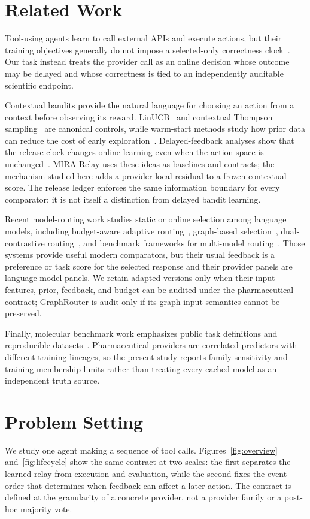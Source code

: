 \documentclass[sigconf,anonymous]{aamas}
\begin{document}
\section{Related Work}
Tool-using agents learn to call external APIs and execute actions, but their training objectives generally do not impose a selected-only correctness clock~\cite{schick2023toolformer,yao2023react}. Our task instead treats the provider call as an online decision whose outcome may be delayed and whose correctness is tied to an independently auditable scientific endpoint.

Contextual bandits provide the natural language for choosing an action from a context before observing its reward. LinUCB~\cite{li2010contextual} and contextual Thompson sampling~\cite{agrawal2013thompson} are canonical controls, while warm-start methods study how prior data can reduce the cost of early exploration~\cite{oetomo2023warmstart}. Delayed-feedback analyses show that the release clock changes online learning even when the action space is unchanged~\cite{joulani2013online}. MIRA-Relay uses these ideas as baselines and contracts; the mechanism studied here adds a provider-local residual to a frozen contextual score. The release ledger enforces the same information boundary for every comparator; it is not itself a distinction from delayed bandit learning.

Recent model-routing work studies static or online selection among language models, including budget-aware adaptive routing~\cite{panda2025pilot}, graph-based selection~\cite{feng2025graphrouter}, dual-contrastive routing~\cite{chen2024routerdc}, and benchmark frameworks for multi-model routing~\cite{hu2024routerbench}. Those systems provide useful modern comparators, but their usual feedback is a preference or task score for the selected response and their provider panels are language-model panels. We retain adapted versions only when their input features, prior, feedback, and budget can be audited under the pharmaceutical contract; GraphRouter is audit-only if its graph input semantics cannot be preserved.

Finally, molecular benchmark work emphasizes public task definitions and reproducible datasets~\cite{huang2021tdc,wu2018moleculenet}. Pharmaceutical providers are correlated predictors with different training lineages, so the present study reports family sensitivity and training-membership limits rather than treating every cached model as an independent truth source.

\section{Problem Setting}
We study one agent making a sequence of tool calls. Figures~\ref{fig:overview} and~\ref{fig:lifecycle} show the same contract at two scales: the first separates the learned relay from execution and evaluation, while the second fixes the event order that determines when feedback can affect a later action. The contract is defined at the granularity of a concrete provider, not a provider family or a post-hoc majority vote.
\end{document}
